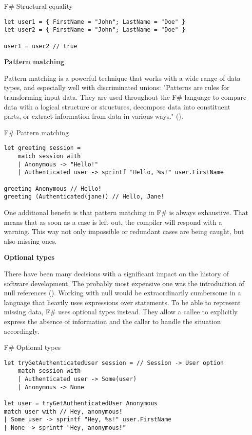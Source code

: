 \begin{listing}[H]
\caption{F\# Structural equality}
\begin{verbatim}
let user1 = { FirstName = "John"; LastName = "Doe" }
let user2 = { FirstName = "John"; LastName = "Doe" }

user1 = user2 // true
\end{verbatim}
\end{listing}

\textbf{Pattern matching}

Pattern matching is a powerful technique that works with a wide range of data types, and especially well with discriminated unions: "Patterns are rules for transforming input data. They are used throughout the F\# language to compare data with a logical structure or structures, decompose data into constituent parts, or extract information from data in various ways." (\cite{microsoft_pattern_2016}).

\begin{listing}[H]
\caption{F\# Pattern matching}
\begin{verbatim}
let greeting session =
    match session with
    | Anonymous -> "Hello!"
    | Authenticated user -> sprintf "Hello, %s!" user.FirstName

greeting Anonymous // Hello!
greeting (Authenticated(jane)) // Hello, Jane!
\end{verbatim}
\end{listing}

One additional benefit is that pattern matching in F\# is always exhaustive. That means that as soon as a case is left out, the compiler will respond with a warning. This way not only impossible or redundant cases are being caught, but also missing ones.

\textbf{Optional types}

There have been many decisions with a significant impact on the history of software development. The probably most expensive one was the introduction of null references (\cite{hoare_null_2009}). Working with null would be extraordinarily cumbersome in a language that heavily uses expressions over statements. To be able to represent missing data, F\# uses optional types instead. They allow a callee to explicitly express the absence of information and the caller to handle the situation accordingly.

\begin{listing}[H]
\caption{F\# Optional types}
\begin{verbatim}
let tryGetAuthenticatedUser session = // Session -> User option
    match session with
    | Authenticated user -> Some(user)
    | Anonymous -> None
    
let user = tryGetAuthenticatedUser Anonymous
match user with // Hey, anonymous!
| Some user -> sprintf "Hey, %s!" user.FirstName
| None -> sprintf "Hey, anonymous!"
\end{verbatim}
\end{listing}

